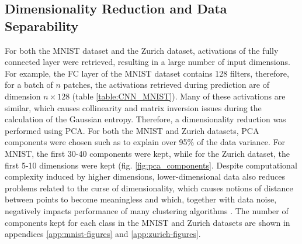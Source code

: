 \documentclass[10pt]{article}
\begin{document}
\subsection{Dimensionality Reduction and Data Separability}
\label{subsec:methodology-dim-reduction}
For both the \gls{MNIST} dataset and the Zurich dataset, activations of the fully connected layer were retrieved, resulting in a large number of input dimensions. For example, the \gls{FC} layer of the \gls{MNIST} dataset contains 128 filters, therefore, for a batch of $n$ patches, the activations retrieved during prediction are of dimension $n \times 128$ (table \ref{table:CNN_MNIST}). Many of these activations are similar, which causes collinearity and matrix inversion issues during the calculation of the Gaussian entropy. Therefore, a dimensionality reduction was performed using \gls{PCA}. For both the \gls{MNIST} and Zurich datasets, \gls{PCA} components were chosen such as to explain over 95\% of the data variance. For \gls{MNIST}, the first 30-40 components were kept, while for the Zurich dataset, the first 5-10 dimensions were kept (fig. \ref{fig:pca_components}. Despite computational complexity induced by higher dimensions, lower-dimensional data also reduces problems related to the curse of dimensionality, which causes notions of distance between points to become meaningless and which, together with data noise, negatively impacts performance of many clustering algorithms \cite{Hinneburg2000WhatIT, Hinneburg1999OptimalGT}. The number of components kept for each class in the \gls{MNIST} and Zurich datasets are shown in appendices \ref{app:mnist-figures} and \ref{app:zurich-figures}.
\end{document}

